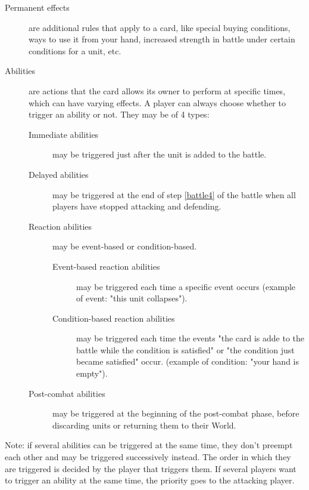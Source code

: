 \documentclass[a4paper]{article}
\begin{document}
    \begin{description}
        \item[Permanent effects] are additional rules that apply to a card,
            like special buying conditions, ways to use it from your hand, 
            increased strength in battle under certain conditions for a unit, etc.
        \item[Abilities] are actions that the card allows its owner
            to perform at specific times, which can have varying effects.
            A player can always choose whether to trigger an ability or not.
            They may be of 4 types:
            
            \begin{description}
        	        \item[Immediate abilities]
                       may be triggered just after the unit is added to the battle.
        	        \item[Delayed abilities]
                       may be triggered at the end of step \ref{battle4} of the battle
                       when all players have stopped attacking and defending.
        	        \item[Reaction abilities] may be event-based or condition-based.
	                    \begin{description}
                            \item[Event-based reaction abilities]
                                may be triggered each time a specific event occurs
                                (example of event: "this unit collapses").
                            \item[Condition-based reaction abilities]
                                may be triggered each time the events
                                "the card is adde to the battle while the condition is satisfied" or
                                "the condition just became satisfied" occur.
                                (example of condition: "your hand is empty").
                        \end{description}
        	        \item[Post-combat abilities]
        	            may be triggered at the beginning of the post-combat phase,
        	            before discarding units or returning them to their World.
            \end{description}
    \end{description}
    
    Note: if several abilities can be triggered at the same time,
    they don't preempt each other and may be triggered successively instead.
    The order in which they are triggered is decided by the player that triggers them.
    If several players want to trigger an ability at the same time,
    the priority goes to the attacking player.
    
\end{document}
